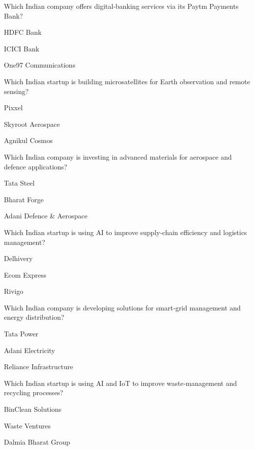 \begin{enhancedmcq}{Which Indian company offers digital‑banking services via its Paytm Payments Bank?}
\item HDFC Bank
\item ICICI Bank
\item One97 Communications

\end{enhancedmcq}
\begin{enhancedmcq}{Which Indian startup is building microsatellites for Earth observation and remote sensing?}
\item Pixxel
\item Skyroot Aerospace
\item Agnikul Cosmos

\end{enhancedmcq}
\begin{enhancedmcq}{Which Indian company is investing in advanced materials for aerospace and defence applications?}
\item Tata Steel
\item Bharat Forge
\item Adani Defence & Aerospace

\end{enhancedmcq}
\begin{enhancedmcq}{Which Indian startup is using AI to improve supply‑chain efficiency and logistics management?}
\item Delhivery
\item Ecom Express
\item Rivigo

\end{enhancedmcq}
\begin{enhancedmcq}{Which Indian company is developing solutions for smart‑grid management and energy distribution?}
\item Tata Power
\item Adani Electricity
\item Reliance Infrastructure

\end{enhancedmcq}
\begin{enhancedmcq}{Which Indian startup is using AI and IoT to improve waste‑management and recycling processes?}
\item BinClean Solutions
\item Waste Ventures
\item Dalmia Bharat Group

\end{enhancedmcq}
